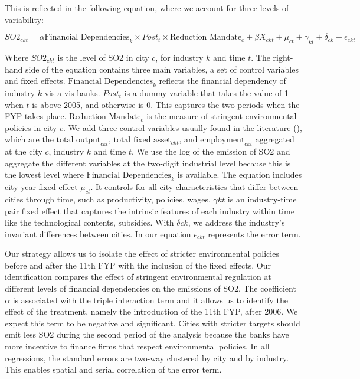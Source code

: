 \documentclass[12pt]{article}
\begin{document}
This is reflected in the following equation, where we account for three levels of variability: 

\begin{equation} \label{eq:main}
SO2_{ckt} = \alpha\text{Financial Dependencies}_{k} \times Post_{t} \times \text{Reduction Mandate}_{c} + \beta X_{ckt} + \mu_{ct} + \gamma_{kt} + \delta_{ck} + \epsilon_{ckt}
\end{equation}

Where $SO2_{ckt}$ is the level of SO2 in city $c$, for industry $k$ and time $t$. The right-hand side of the equation contains three main variables, a set of control variables and fixed effects. $\text{Financial Dependencies}_{k}$ reflects the financial dependency of industry $k$ vis-a-vis banks. $Post_t$ is a dummy variable that takes the value of 1 when $t$ is above 2005, and otherwise is 0. This captures the two periods when the FYP takes place. $\text{Reduction Mandate}_{c}$ is the measure of stringent environmental policies in city $c$. We add three control variables usually found in the literature (\cite{Andersen2015-pa, Andersen2017-wf}), which are the $\text{total output}_{ckt}$, $\text{total fixed asset}_{ckt}$, and $\text{employment}_{ckt}$ aggregated at the city $c$, industry $k$ and time $t$. We use the log of the emission of SO2 and aggregate the different variables at the two-digit industrial level because this is the lowest level where $\text{Financial Dependencies}_{k}$ is available. The equation includes city-year fixed effect $\mu_{ct}$. It controls for all city characteristics that differ between cities through time, such as productivity, policies, wages. $\gamma{kt}$ is an industry-time pair fixed effect that captures the intrinsic features of each industry within time like the technological contents, subsidies. With $\delta{ck}$, we address the industry's invariant differences between cities. In our equation $\epsilon_{ckt}$ represents the error term.

Our strategy allows us to isolate the effect of stricter environmental policies before and after the 11th FYP with the inclusion of the fixed effects. Our identification compares the effect of stringent environmental regulation at different levels of financial dependencies on the emissions of SO2. The coefficient $\alpha$ is associated with the triple interaction term and it allows us to identify the effect of the treatment, namely the introduction of the 11th FYP, after 2006. We expect this term to be negative and significant. Cities with stricter targets should emit less SO2 during the second period of the analysis because the banks have more incentive to finance firms that respect environmental policies. In all regressions, the standard errors are two-way clustered by city and by industry. This enables spatial and serial correlation of the error term.
\end{document}
